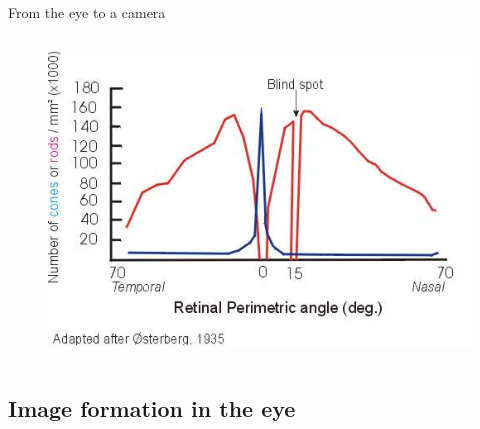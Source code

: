 \documentclass[table]{beamer}
\begin{document}
\begin{frame}
\begin{block}{From the eye to a camera}
\begin{columns}
\begin{column}{.5\linewidth}
{\begin{figure}
            \includegraphics[width=.9\textwidth]{./images/distri.jpg}
          \end{figure}}
      \end{column}
    \end{columns}    
  \end{block}
\end{frame}

\subsection{Image formation in the eye}
\end{document}
